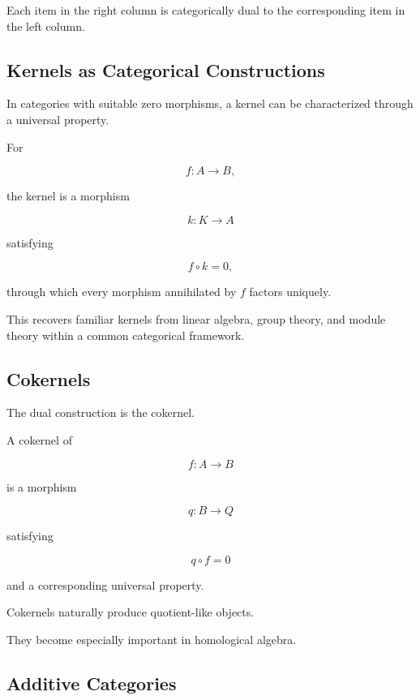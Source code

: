 Each item in the right column is categorically dual to the corresponding
item in the left column.

\subsection{Kernels as Categorical Constructions}
\label{subsec:categorical-kernels}

In categories with suitable zero morphisms, a kernel can be characterized
through a universal property.

For

\[ f:A\to B, \]

the kernel is a morphism

\[ k:K\to A \]

satisfying

\[ f\circ k=0, \]

through which every morphism annihilated by \(f\) factors uniquely.

This recovers familiar kernels from linear algebra, group theory, and module
theory within a common categorical framework.

\subsection{Cokernels}
\label{subsec:categorical-cokernels}

The dual construction is the cokernel.

A cokernel of

\[ f:A\to B \]

is a morphism

\[ q:B\to Q \]

satisfying

\[ q\circ f=0 \]

and a corresponding universal property.

Cokernels naturally produce quotient-like objects.

They become especially important in homological algebra.

\subsection{Additive Categories}
\label{subsec:additive-categories}

